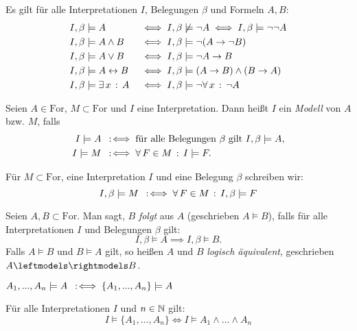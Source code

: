 \documentclass{cheat-sheet}
\newcommand{\Ibm}{I, \beta \models}
\newcommand{\Ibnm}{I, \beta \not\models}
\newcommand{\lra}{\leftrightarrow}
\newcommand{\For}{\mathrm{For}} %
\newcommand{\eqmodels}{\leftmodels \rightmodels} %
\begin{document}

\begin{prop}
  Es gilt für alle Interpretationen $I$, Belegungen $\beta$ und Formeln $A, B$:
  \begin{alignat*}{2}
    & \Ibm A &&\iff \Ibnm \neg A \iff \Ibm \neg\neg A\\
    & \Ibm A \wedge B &&\iff \Ibm \neg (A \to \neg B)\\
    & \Ibm A \vee B &&\iff \Ibm \neg A \to B\\
    & \Ibm A \lra B &&\iff \Ibm (A \to B) \wedge (B \to A)\\
    & \Ibm \ex{x} A &&\iff \Ibm \neg \fa{x} \neg A
  \end{alignat*}
\end{prop}


\begin{defn}
  Seien $A \in \For$, $M \subset \For$ und $I$ eine Interpretation. Dann heißt $I$ ein \emph{Modell} von $A$ bzw. $M$, falls
  \begin{align*}
    I \models A &\coloniff \text{für alle Belegungen $\beta$ gilt } \Ibm A,\\
    I \models M &\coloniff \fa{F \in M} I \models F.
  \end{align*}
\end{defn}

\begin{nota}
  Für $M \subset \For$, eine Interpretation $I$ und eine Belegung $\beta$ schreiben wir:
  \[ \Ibm M \coloniff \fa{F \in M} \Ibm F \]
\end{nota}

\begin{defn}
  Seien $A, B \subset \For$. Man sagt, $B$ \emph{folgt} aus $A$ (geschrieben $A \models B$), falls für alle Interpretationen $I$ und Belegungen $\beta$ gilt:
  \[ \Ibm A \implies \Ibm B. \]
  Falls $A \models B$ und $B \models A$ gilt, so heißen $A$ und $B$ \emph{logisch äquivalent}, geschrieben $A \eqmodels B$.
\end{defn}

\begin{nota}
  $A_1, ..., A_n \models A \enspace:\!\iff \{ A_1, ..., A_n \} \models A$
\end{nota}

\begin{satz}
  Für alle Interpretationen $I$ und $n \in \mathbb{N}$ gilt:
  \[ I \models \{ A_1, ..., A_n \} \iff I \models A_1 \wedge ... \wedge A_n \]
\end{satz}
\end{document}
